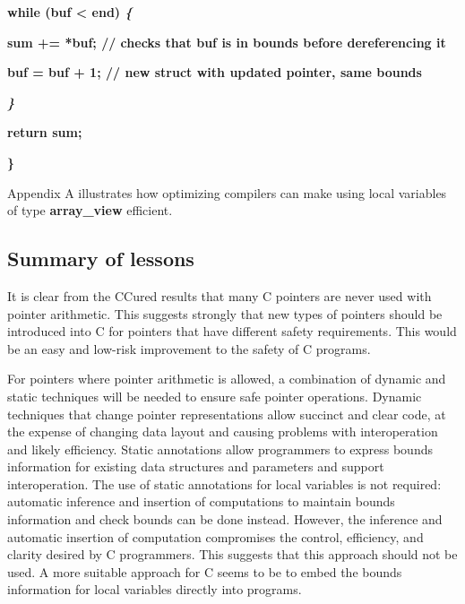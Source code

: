 \documentclass[]{article}
\begin{document}
\textbf{while (buf \textless{} end) \emph{\{}}

\textbf{sum += *buf; // checks that buf is in bounds before
dereferencing it }

\textbf{buf = buf + 1; // new struct with updated pointer, same bounds}

\emph{\textbf{\}}}

\textbf{return sum;}

\textbf{\}}

Appendix A illustrates how optimizing compilers can make using local
variables of type \textbf{array\_view} efficient.

\subsection{\texorpdfstring{\protect\hypertarget{ux5fToc420589171}{}{\protect\hypertarget{ux5fToc422906952}{}{\protect\hypertarget{ux5fToc424307675}{}{\protect\hypertarget{ux5fToc426641131}{}{\protect\hypertarget{ux5fToc435435006}{}{\protect\hypertarget{ux5fToc437460839}{}{\protect\hypertarget{ux5fToc440445520}{}{\protect\hypertarget{ux5fToc440449302}{}{\protect\hypertarget{ux5fToc440551952}{}{}}}}}}}}}Summary
of lessons}{Summary of lessons}}\label{summary-of-lessons}

It is clear from the CCured results that many C pointers are never used
with pointer arithmetic. This suggests strongly that new types of
pointers should be introduced into C for pointers that have different
safety requirements. This would be an easy and low-risk improvement to
the safety of C programs.

For pointers where pointer arithmetic is allowed, a combination of
dynamic and static techniques will be needed to ensure safe pointer
operations. Dynamic techniques that change pointer representations allow
succinct and clear code, at the expense of changing data layout and
causing problems with interoperation and likely efficiency. Static
annotations allow programmers to express bounds information for existing
data structures and parameters and support interoperation. The use of
static annotations for local variables is not required: automatic
inference and insertion of computations to maintain bounds information
and check bounds can be done instead. However, the inference and
automatic insertion of computation compromises the control, efficiency,
and clarity desired by C programmers. This suggests that this approach
should not be used. A more suitable approach for C seems to be to embed
the bounds information for local variables directly into programs.
\end{document}
